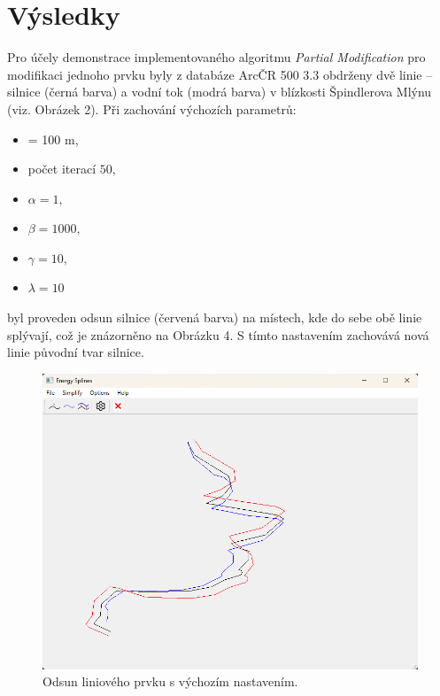 \chapter*{Výsledky}
\par Pro účely demonstrace implementovaného algoritmu \emph{Partial Modification} pro modifikaci jednoho prvku byly z databáze ArcČR 500 3.3 obdrženy dvě linie – silnice (černá barva) a vodní tok (modrá barva) v blízkosti Špindlerova Mlýnu (viz. Obrázek 2). Při zachování výchozích parametrů:
\begin{itemize}
    \item[]  = 100 m,
    \item[] počet iterací $50$,
    \item[] $\alpha = 1,$
    \item[] $\beta = 1000,$
    \item[] $\gamma = 10,$
    \item[] $\lambda = 10$
\end{itemize}
\par byl proveden odsun silnice (červená barva) na místech, kde do sebe obě linie splývají, což je znázorněno na Obrázku 4. S tímto nastavením zachovává nová linie původní tvar silnice.
\begin{figure}[H]
\centering
\includegraphics[width=14cm]{images/displacement.png} 
    \caption{Odsun liniového prvku s výchozím nastavením.}
\end{figure}
